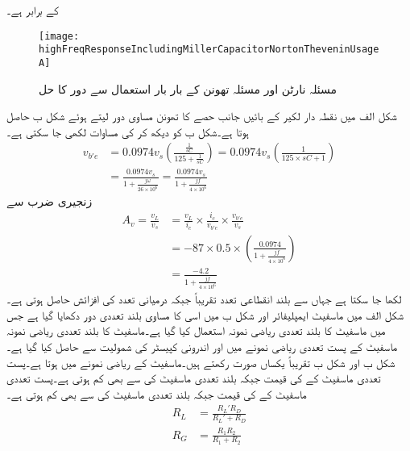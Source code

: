 کے برابر ہے۔
\begin{figure}
\centering
\texttt{[image: highFreqResponseIncludingMillerCapacitorNortonTheveninUsageA]}
\caption{مسئلہ نارٹن اور مسئلہ تھونن کے بار بار استعمال سے دور کا حل}
\label{شکل_تعددی_ردعمل_ماسفیٹ_مشترکہ_مخارج_نارٹن_تھونن_بار_بار_الف}
\end{figure}
شکل  الف میں نقطہ دار لکیر کے بائیں جانب حصے کا تھونن مساوی دور لیتے ہوئے شکل  ب حاصل ہوتا ہے۔شکل  ب کو دیکھ کر  کی مساوات لکھی جا سکتی ہے۔
\begin{align*}
v_{b'e}&=0.0974 v_s \left(\frac{\frac{1}{sC}}{125+\frac{1}{sC}}\right)=0.0974 v_s \left(\frac{1}{125 \times s C+1}\right)\\
&=\frac{0.0974 v_s }{1+\frac{j \omega}{26 \times 10^6}}=\frac{0.0974 v_s }{1+\frac{j f}{4 \times 10^6}}
\end{align*}
زنجیری ضرب سے
\begin{align*}
A_v=\frac{v_L}{v_s}&=\frac{v_L}{i_c} \times \frac{i_c}{v_{b'e}} \times \frac{v_{b'e}}{v_s}\\
&=-87 \times 0.5 \times \left(\frac{0.0974}{1+\frac{j f}{4 \times 10^6}}\right)\\
&=\frac{-4.2}{1+\frac{j f}{4 \times 10^6}}
\end{align*}
لکھا جا سکتا ہے جہاں سے بلند انقطاعی تعدد تقریباً  جبکہ درمیانی تعدد کی افزائش  حاصل ہوتی ہے۔ 
شکل  الف میں ماسفیٹ ایمپلیفائر اور شکل  ب میں اسی کا مساوی بلند تعددی دور دکھایا گیا ہے جس میں ماسفیٹ کا بلند تعددی ریاضی نمونہ استعمال کیا گیا ہے۔ماسفیٹ کا بلند تعددی ریاضی نمونہ ماسفیٹ کے پست تعددی ریاضی نمونے میں  اور  اندرونی کپیسٹر کی شمولیت سے حاصل کیا گیا ہے۔شکل  ب اور شکل  ب  تقریباً یکساں صورت رکھتے ہیں۔ماسفیٹ کے ریاضی نمونے میں   ہوتا ہے۔پست تعددی ماسفیٹ کے  کی قیمت  جبکہ بلند تعددی ماسفیٹ کی  سے بھی کم ہوتی ہے۔پست تعددی ماسفیٹ کے  کی قیمت  جبکہ بلند تعددی ماسفیٹ کی  سے بھی کم ہوتی ہے۔
\begin{align*}
R_L&=\frac{R_L' R_D}{R_L'+R_D}\\
R_G&=\frac{R_1 R_2}{R_1+R_2}
\end{align*}
